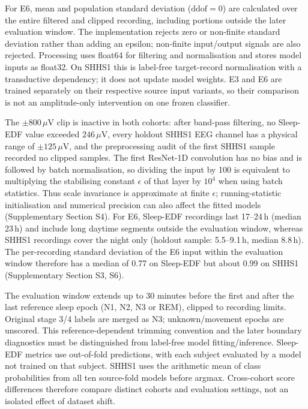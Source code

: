\documentclass[10pt,a4paper]{article}
\begin{document}
For E6, mean and population standard deviation ($\mathrm{ddof}=0$) are calculated over the entire
filtered and clipped recording, including portions outside the later evaluation window. The
implementation rejects zero or non-finite standard deviation rather than adding an epsilon;
non-finite input/output signals are also rejected. Processing uses float64 for filtering and
normalisation and stores model inputs as float32. On SHHS1 this is label-free target-record
normalisation with a transductive dependency; it does not update model weights. E3 and E6 are
trained separately on their respective source input variants, so their comparison is not an
amplitude-only intervention on one frozen classifier.

The $\pm800\,\mu$V clip is inactive in both cohorts: after band-pass filtering, no Sleep-EDF value
exceeded $246\,\mu$V, every holdout SHHS1 EEG channel has a physical range of $\pm125\,\mu$V, and
the preprocessing audit of the first SHHS1 sample recorded no clipped samples. The first ResNet-1D convolution has no bias and is followed by batch normalisation,
so dividing the input by 100 is equivalent to multiplying the stabilising constant $\epsilon$ of that
layer by $10^4$ when using batch statistics. Thus scale invariance is approximate at finite
$\epsilon$; running-statistic initialisation and numerical precision can also affect the fitted
models (Supplementary Section S4). For E6, Sleep-EDF recordings last 17--24\,h (median 23\,h) and include
long daytime segments outside the evaluation window, whereas SHHS1 recordings cover the night only
(holdout sample: 5.5--9.1\,h, median 8.8\,h). The per-recording standard deviation of the E6 input
within the evaluation window therefore has a median of 0.77 on Sleep-EDF but about 0.99 on SHHS1
(Supplementary Section S3, S6).

The evaluation window extends up to 30 minutes before the first and after the last reference
sleep epoch (N1, N2, N3 or REM), clipped to recording limits. Original stage 3/4 labels are merged
as N3; unknown/movement epochs are unscored. This reference-dependent trimming convention and
the later boundary diagnostics must be distinguished from label-free model fitting/inference.
Sleep-EDF metrics use out-of-fold predictions, with each subject evaluated by a model not trained
on that subject. SHHS1 uses the arithmetic mean of class probabilities from all ten source-fold
models before argmax. Cross-cohort score differences therefore compare distinct cohorts and
evaluation settings, not an isolated effect of dataset shift.
\end{document}
